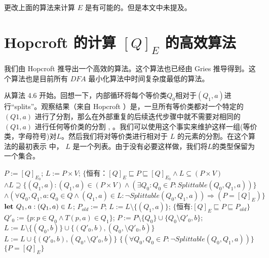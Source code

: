更改上面的算法来计算 $E$ 是有可能的。但是本文中未提及。

\section{Hopcroft 的计算 $[Q]_E$ 的高效算法}

我们由 Hopcroft 推导出一个高效的算法。这个算法也已经由 Gries \cite{Grie73} 推导得到。这个算法也是目前所有 $DFA$ 最小化算法中时间复杂度最低的算法。 %

从算法 4.6 开始。回想一下，内部循环将每个等价类$Q_0$相对于$(Q_1, a)$进行“splits”。观察结果（来自 Hopcroft ）是，一旦所有等价类都对一个特定的 $(Q1,a)$ 进行了分割，那么在外部重复的后续迭代步骤中就不需要对相同的$(Q1,a)$ 进行任何等价类的分割 \cite[pp.190-191]{Hopc71}, \cite[引理 5]{Grie73}。我们可以使用这个事实来维护这样一组(等价类，字母符号)对$L$。然后我们将对等价类进行相对于 $L$ 的元素的分割。在这个算法的最初表示 \cite{Hopc71, Grie73} 中， $L$ 是一个列表。由于没有必要这样做，我们将$L$的类型保留为一个集合。

\begin{algorithm}
    \small
    \begin{algorithmic}[1]
        \State $P:=[Q]_{E_0}$;
        \State $L:=P\times V$;
        \State $\{ \mbox{恒有：} [Q]_E \sqsubseteq P \sqsubseteq [Q]_{E_0} \land L \subseteq (P \times V) $
        \State \quad $ \land L \supseteq  \{ (Q_1,a) : (Q_1,a) \in (P \times V) \land ( \exists Q_0 : Q_0 \in P : Splittable (Q_0,Q_1,a) ) \} $
        \State \quad $ \land (\forall Q_0,Q_1,a:Q_0 \in Q \land (Q_1,a) \in L : \neg Splittable (Q_0,Q_1,a)) \Rightarrow (P=[Q]_E) \} $
            \State $ \mbox{\textbf{let }} Q_1,a:(Q_1,a) \in L $;
            \State $ P_{old} := P $;
            \State $ L := L \setminus \{ (Q_1,a) \} $;
            \State $ \{ \mbox{恒有:} [Q]_E \sqsubseteq P \sqsubseteq P_{old} \} $
                \State $ Q'_0 := \{ p:p \in Q_0 \land T(p,a) \in Q_1 \} $;
                \State $ P:= P \setminus \{ Q_0 \} \cup \{ Q_0 \setminus Q'_0,b \} $;
                       $ L := L \setminus \{ (Q_0,b) \} \cup \{ (Q'_0,b),(Q_0, \setminus Q'_0,b ) \} $
                        $L := L \cup \{ (Q'_0,b),(Q_0, \setminus Q'_0,b ) \}$
                    \EndIf
                \EndFor
            \EndFor
            \State $ \{ (\forall Q_0,Q_0 \in P : \neg Splittable(Q_0,Q_1,a)) \} $
        \Until $\{ P = [Q]_E \}$
    \end{algorithmic}
\end{algorithm}

